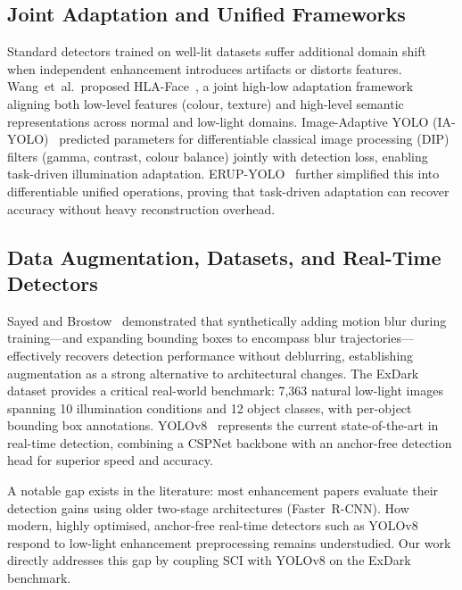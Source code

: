 \documentclass[conference]{IEEEtran}
\begin{document}
\subsection{Joint Adaptation and Unified Frameworks}

Standard detectors trained on well-lit datasets suffer additional domain
shift when independent enhancement introduces artifacts or distorts
features. Wang~et~al.\ proposed HLA-Face~\cite{wang2021hlaface}, a
joint high-low adaptation framework aligning both low-level features
(colour, texture) and high-level semantic representations across normal
and low-light domains. Image-Adaptive YOLO (IA-YOLO)~\cite{liu2022iayolo}
predicted parameters for differentiable classical image processing (DIP)
filters (gamma, contrast, colour balance) jointly with detection loss,
enabling task-driven illumination adaptation. ERUP-YOLO~\cite{ogino2025erupyolo}
further simplified this into differentiable unified operations, proving
that task-driven adaptation can recover accuracy without heavy
reconstruction overhead.

\subsection{Data Augmentation, Datasets, and Real-Time Detectors}

Sayed and Brostow~\cite{sayed2021motionblur} demonstrated that
synthetically adding motion blur during training---and expanding
bounding boxes to encompass blur trajectories---effectively recovers
detection performance without deblurring, establishing augmentation as a
strong alternative to architectural changes. The
ExDark~\cite{loh2019exdark} dataset provides a critical real-world
benchmark: 7,363 natural low-light images spanning 10 illumination
conditions and 12 object classes, with per-object bounding box
annotations. YOLOv8~\cite{jocher2023yolo} represents the current
state-of-the-art in real-time detection, combining a CSPNet backbone
with an anchor-free detection head for superior speed and accuracy.

A notable gap exists in the literature: most enhancement papers evaluate
their detection gains using older two-stage architectures
(Faster~R-CNN). How modern, highly optimised, anchor-free real-time
detectors such as YOLOv8 respond to low-light enhancement preprocessing
remains understudied. Our work directly addresses this gap by coupling
SCI with YOLOv8 on the ExDark benchmark.

\end{document}
